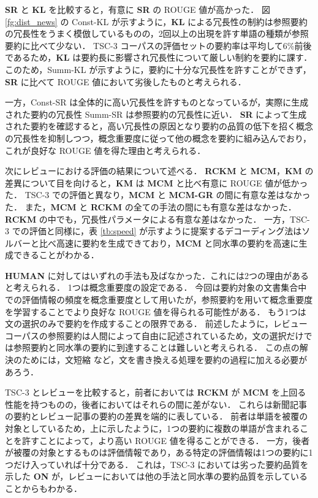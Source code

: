 \documentclass[japanese]{jnlp_1.4}
\begin{document}
{\bf SR} と {\bf KL} を比較すると，有意に {\bf SR} の ROUGE 値が高かった．
図 \ref{fg:dist_news} の Const-KL が示すように，{\bf KL} による冗長性の制約は参照要約の冗長性をうまく模倣しているものの，2回以上の出現を許す単語の種類が参照要約に比べて少ない．
TSC-3 コーパスの評価セットの要約率は平均して6\%前後であるため，{\bf KL} は要約長に影響され冗長性について厳しい制約を要約に課す．
このため，Summ-KL が示すように，要約に十分な冗長性を許すことができず，{\bf SR} に比べて ROUGE 値において劣後したものと考えられる．

一方，Const-SR は全体的に高い冗長性を許すものとなっているが，実際に生成された要約の冗長性 Summ-SR は参照要約の冗長性に近い．
{\bf SR} によって生成された要約を確認すると，高い冗長性の原因となり要約の品質の低下を招く概念の冗長性を抑制しつつ，概念重要度に従って他の概念を要約に組み込んでおり，これが良好な ROUGE 値を得た理由と考えられる．

次にレビューにおける評価の結果について述べる．
{\bf RCKM} と {\bf MCM}，{\bf KM} の差異について目を向けると，{\bf KM} は {\bf MCM} と比べ有意に ROUGE 値が低かった．
TSC-3 での評価と異なり，{\bf MCM} と {\bf MCM-GR} の間に有意な差はなかった．
また，{\bf MCM} と {\bf RCKM} の全ての手法の間にも有意な差はなかった．
{\bf RCKM } の中でも，冗長性パラメータによる有意な差はなかった．
一方，TSC-3 での評価と同様に，表 \ref{tb:speed} が示すように提案するデコーディング法はソルバーと比べ高速に要約を生成できており，{\bf MCM} と同水準の要約を高速に生成できることがわかる．

{\bf HUMAN} に対してはいずれの手法も及ばなかった．これには2つの理由があると考えられる．
1つは概念重要度の設定である．
今回は要約対象の文書集合中での評価情報の頻度を概念重要度として用いたが，参照要約を用いて概念重要度を学習することでより良好な ROUGE 値を得られる可能性がある．
もう1つは文の選択のみで要約を作成することの限界である．
前述したように，レビューコーパスの参照要約は人間によって自由に記述されているため，文の選択だけでは参照要約と同水準の要約に到達することは難しいと考えられる．
この点の解決のためには，文短縮 \cite{hirao09a} など，文を書き換える処理を要約の過程に加える必要があろう．

TSC-3 とレビューを比較すると，前者においては {\bf RCKM } が {\bf MCM } を上回る性能を持つものの，後者においてはそれらの間に差がない．
これらは新聞記事の要約とレビュー記事の要約の差異を端的に表している．
前者は単語を被覆の対象としているため，上に示したように，1つの要約に複数の単語が含まれることを許すことによって，より高い ROUGE 値を得ることができる．
一方，後者が被覆の対象とするものは評価情報であり，ある特定の評価情報は1つの要約に1つだけ入っていれば十分である．
これは，TSC-3 においては劣った要約品質を示した {\bf ON } が，レビューにおいては他の手法と同水準の要約品質を示していることからもわかる．
\end{document}
